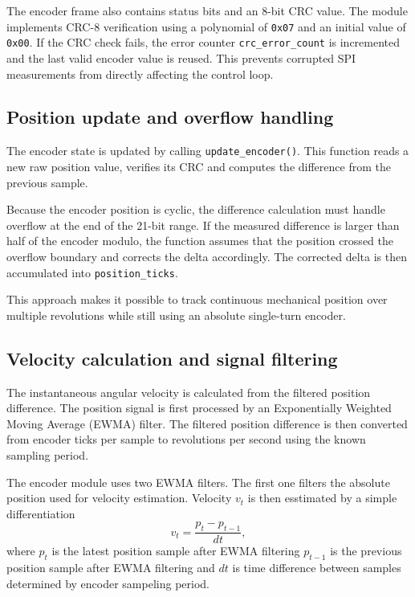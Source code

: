 The encoder frame also contains status bits and an 8-bit CRC value. The module implements CRC-8 verification using a polynomial of \texttt{0x07} 
and an initial value of \texttt{0x00}. If the CRC check fails, the error counter \texttt{crc\_error\_count} 
is incremented and the last valid encoder value is reused. This prevents corrupted SPI measurements from directly affecting the control loop. \cite{datasheet_MT6835}

\subsection{Position update and overflow handling}
The encoder state is updated by calling \texttt{update\_encoder()}. 
This function reads a new raw position value, verifies its CRC and computes the difference from the previous sample.

Because the encoder position is cyclic, the difference calculation must handle overflow at the end of the 21-bit range. 
If the measured difference is larger than half of the encoder modulo, the function assumes that the position crossed the overflow boundary
and corrects the delta accordingly. The corrected delta is then accumulated into \texttt{position\_ticks}.

This approach makes it possible to track continuous mechanical position over multiple revolutions while still using an absolute single-turn encoder.


\subsection{Velocity calculation and signal filtering}
The instantaneous angular velocity is calculated from the filtered position difference. 
The position signal is first processed by an Exponentially Weighted Moving Average (EWMA) filter. 
The filtered position difference is then converted from encoder ticks per sample to revolutions per second using the known sampling period.

The encoder module uses two EWMA filters. The first one filters the absolute position used for velocity estimation.
Velocity $v_t$ is then esstimated by a simple differentiation
\begin{equation}
    v_t = \frac{p_t - p _{t-1}}{dt},
\end{equation}
where $p_t$ is the latest position sample after EWMA filtering $p_{t-1}$ is the previous position sample after EWMA filtering
and $dt$ is time difference between samples determined by encoder sampeling period.

